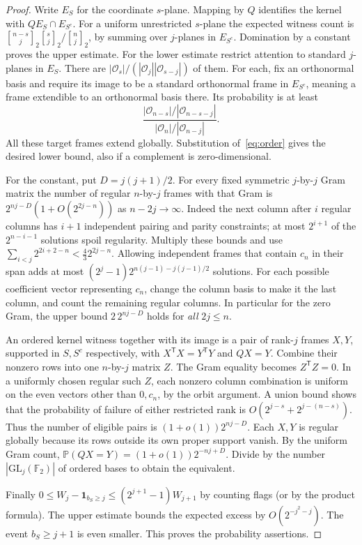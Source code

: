 \documentclass[11pt,letterpaper]{article}
\newcommand{\F}{\mathbb F_2}\newcommand{\E}{\mathbb E}\newcommand{\PP}{\mathbb P}
\newcommand{\GL}{\mathrm{GL}}\newcommand{\nul}{\operatorname{null}}
\newcommand{\ga}[2]{\genfrac{[}{]}{0pt}{}{#1}{#2}_{\!2}}
\newcommand{\ind}{\mathbf 1}
\newcommand{\rgp}{\mathcal O}
\begin{document}
\begin{proof}
Write $E_S$ for the coordinate $s$-plane. Mapping by $Q$ identifies the kernel with $QE_S\cap E_{S^c}$. For a uniform unrestricted $s$-plane the expected witness count is $\ga{n-s}j\ga sj/\ga nj$, by summing over $j$-planes in $E_{S^c}$. Domination by a constant proves the upper estimate. For the lower estimate restrict attention to standard $j$-planes in $E_S$. There are $|\rgp_s|/(|\rgp_j||\rgp_{s-j}|)$ of them. For each, fix an orthonormal basis and require its image to be a standard orthonormal frame in $E_{S^c}$, meaning a frame extendible to an orthonormal basis there. Its probability is at least
\[
 \frac{|\rgp_{n-s}|/|\rgp_{n-s-j}|}{|\rgp_n|/|\rgp_{n-j}|}.
\]
All these target frames extend globally. Substitution of~\eqref{eq:order} gives the desired lower bound, also if a complement is zero-dimensional.

For the constant, put $D=j(j+1)/2$. For every fixed symmetric $j$-by-$j$ Gram matrix the number of regular $n$-by-$j$ frames with that Gram is $2^{nj-D}(1+O(2^{2j-n}))$ as $n-2j\to\infty$. Indeed the next column after $i$ regular columns has $i+1$ independent pairing and parity constraints; at most $2^{i+1}$ of the $2^{n-i-1}$ solutions spoil regularity. Multiply these bounds and use $\sum_{i<j}2^{2i+2-n}<\tfrac43 2^{2j-n}$. Allowing independent frames that contain $c_n$ in their span adds at most $(2^j-1)2^{n(j-1)-j(j-1)/2}$ solutions. For each possible coefficient vector representing $c_n$, change the column basis to make it the last column, and count the remaining regular columns. In particular for the zero Gram, the upper bound $2\,2^{nj-D}$ holds for \emph{all} $2j\le n$.

An ordered kernel witness together with its image is a pair of rank-$j$ frames $X,Y$, supported in $S,S^c$ respectively, with $X^{\mathsf T}X=Y^{\mathsf T}Y$ and $QX=Y$. Combine their nonzero rows into one $n$-by-$j$ matrix $Z$. The Gram equality becomes $Z^{\mathsf T}Z=0$. In a uniformly chosen regular such $Z$, each nonzero column combination is uniform on the even vectors other than $0,c_n$, by the orbit argument. A union bound shows that the probability of failure of either restricted rank is $O(2^{j-s}+2^{j-(n-s)})$. Thus the number of eligible pairs is $(1+o(1))2^{nj-D}$. Each $X,Y$ is regular globally because its rows outside its own proper support vanish. By the uniform Gram count, $\PP(QX=Y)=(1+o(1))2^{-nj+D}$. Divide by the number $|\GL_j(\F)|$ of ordered bases to obtain the equivalent.

Finally $0\le W_j-\ind_{b_S\ge j}\le(2^{j+1}-1)W_{j+1}$ by counting flags (or by the product formula). The upper estimate bounds the expected excess by $O(2^{-j^2-j})$. The event $b_S\ge j+1$ is even smaller. This proves the probability assertions.
\end{proof}
\end{document}
